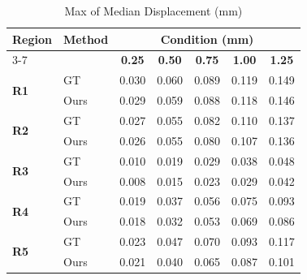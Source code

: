 \documentclass{article}
\begin{document}
\thispagestyle{empty}

\begin{table}[h]
\centering
\caption{Max of Median Displacement (mm)}
\vspace{0.3cm}
\begin{tabular}{llccccc}
\toprule
\textbf{Region} & \textbf{Method} & \multicolumn{5}{c}{\textbf{Condition (mm)}} \\
\cmidrule(lr){3-7}
& & \textbf{0.25} & \textbf{0.50} & \textbf{0.75} & \textbf{1.00} & \textbf{1.25} \\
\midrule
\multirow{2}{*}{\textbf{R1}} & GT  & 0.030 & 0.060 & 0.089 & 0.119 & 0.149 \\
 & Ours  & 0.029 & 0.059 & 0.088 & 0.118 & 0.146 \\ \midrule
\multirow{2}{*}{\textbf{R2}} & GT  & 0.027 & 0.055 & 0.082 & 0.110 & 0.137 \\
 & Ours  & 0.026 & 0.055 & 0.080 & 0.107 & 0.136 \\ \midrule
\multirow{2}{*}{\textbf{R3}} & GT  & 0.010 & 0.019 & 0.029 & 0.038 & 0.048 \\
 & Ours  & 0.008 & 0.015 & 0.023 & 0.029 & 0.042 \\ \midrule
\multirow{2}{*}{\textbf{R4}} & GT  & 0.019 & 0.037 & 0.056 & 0.075 & 0.093 \\
 & Ours  & 0.018 & 0.032 & 0.053 & 0.069 & 0.086 \\ \midrule
\multirow{2}{*}{\textbf{R5}} & GT  & 0.023 & 0.047 & 0.070 & 0.093 & 0.117 \\
 & Ours  & 0.021 & 0.040 & 0.065 & 0.087 & 0.101 \\
\bottomrule
\end{tabular}
\end{table}
\end{document}
